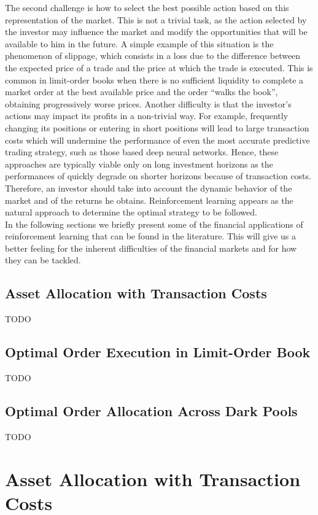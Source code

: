 The second challenge is how to select the best possible action based on this representation of the market. This is not a trivial task, as the action selected by the investor may influence the market and modify the opportunities that will be available to him in the future. A simple example of this situation is the phenomenon of slippage, which consists in a loss due to the difference between the expected price of a trade and the price at which the trade is executed. This is common in limit-order books when there is no sufficient liquidity to complete a market order at the best available price and the order ``walks the book'', obtaining progressively worse prices. Another difficulty is that the investor's actions may impact its profits in a non-trivial way. 
For example, frequently changing its positions or entering in short positions will lead to large transaction costs which will undermine the performance of even the most accurate predictive trading strategy, such as those based deep neural networks. Hence, these approaches are typically viable only on long investment horizons as the performances of quickly degrade on shorter horizons because of transaction costs. Therefore, an investor should take into account the dynamic behavior of the market and of the returns he obtains. Reinforcement learning appears as the natural approach to determine the optimal strategy to be followed.\\
In the following sections we briefly present some of the financial applications of reinforcement learning that can be found in the literature. This will give us a better feeling for the inherent difficulties of the financial markets and for how they can be tackled. 

\subsection{Asset Allocation with Transaction Costs}
TODO

\subsection{Optimal Order Execution in Limit-Order Book}
TODO 

\subsection{Optimal Order Allocation Across Dark Pools}
TODO


\section{Asset Allocation with Transaction Costs}
\label{sec:asset_allocation_with_transaction_costs}

